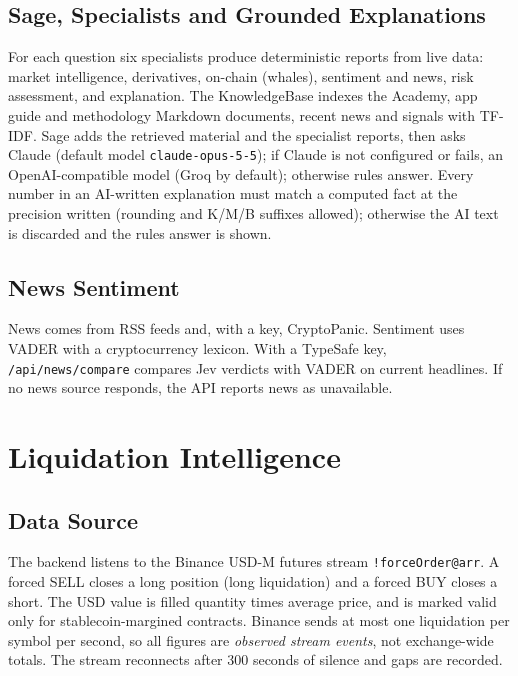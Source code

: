 \subsection{Sage, Specialists and Grounded Explanations}
For each question six specialists produce deterministic reports from live data: market intelligence, derivatives, on-chain (whales), sentiment and news, risk assessment, and explanation. The KnowledgeBase indexes the Academy, app guide and methodology Markdown documents, recent news and signals with TF-IDF. Sage adds the retrieved material and the specialist reports, then asks Claude (default model \texttt{claude-opus-5-5}); if Claude is not configured or fails, an OpenAI-compatible model (Groq by default); otherwise rules answer. Every number in an AI-written explanation must match a computed fact at the precision written (rounding and K/M/B suffixes allowed); otherwise the AI text is discarded and the rules answer is shown.

\subsection{News Sentiment}
News comes from RSS feeds and, with a key, CryptoPanic. Sentiment uses VADER with a cryptocurrency lexicon. With a TypeSafe key, \texttt{/api/news/compare} compares Jev verdicts with VADER on current headlines. If no news source responds, the API reports news as unavailable.

\section{Liquidation Intelligence}
\subsection{Data Source}
The backend listens to the Binance USD-M futures stream \texttt{!forceOrder@arr}. A forced SELL closes a long position (long liquidation) and a forced BUY closes a short. The USD value is filled quantity times average price, and is marked valid only for stablecoin-margined contracts. Binance sends at most one liquidation per symbol per second, so all figures are \textit{observed stream events}, not exchange-wide totals. The stream reconnects after 300 seconds of silence and gaps are recorded.

